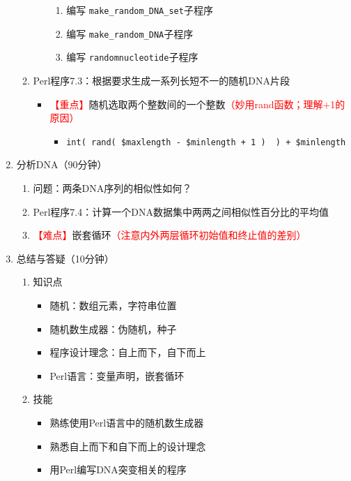 \documentclass{TIJMUjiaoanLL}
\begin{document}
\begin{enumerate}
\begin{enumerate}
\begin{itemize}
\begin{enumerate}
	      \item 编写 \verb|make_random_DNA_set|子程序
	      \item 编写 \verb|make_random_DNA|子程序
	      \item 编写 \verb|randomnucleotide|子程序
	    \end{enumerate}
	\end{itemize}
      \item Perl程序7.3：根据要求生成一系列长短不一的随机DNA片段
	\begin{itemize}
	  \item \textcolor{red}{【重点】}随机选取两个整数间的一个整数\textcolor{red}{（妙用rand函数；理解+1的原因）}
	    \begin{itemize}
	      \item \verb|int( rand( $maxlength - $minlength + 1 )  ) + $minlength|
	    \end{itemize}
	\end{itemize}
    \end{enumerate}
  \item 分析DNA（90分钟）
    \begin{enumerate}
      \item 问题：两条DNA序列的相似性如何？
      \item Perl程序7.4：计算一个DNA数据集中两两之间相似性百分比的平均值
      \item \textcolor{red}{【难点】}嵌套循环\textcolor{red}{（注意内外两层循环初始值和终止值的差别）}
    \end{enumerate}
  \item 总结与答疑（10分钟）
    \begin{enumerate}
      \item 知识点
	\begin{itemize}
	  \item 随机：数组元素，字符串位置
	  \item 随机数生成器：伪随机，种子
	  \item 程序设计理念：自上而下，自下而上
	  \item Perl语言：变量声明，嵌套循环
	\end{itemize}
      \item 技能
	\begin{itemize}
	  \item 熟练使用Perl语言中的随机数生成器
	  \item 熟悉自上而下和自下而上的设计理念
	  \item 用Perl编写DNA突变相关的程序
	\end{itemize}
    \end{enumerate}
\end{enumerate}

\otherTail

\end{document}
